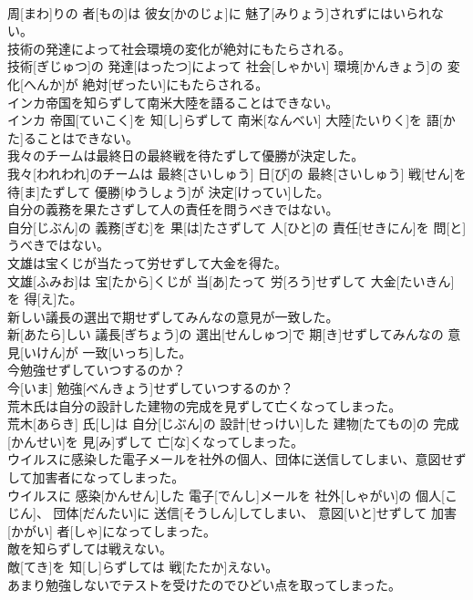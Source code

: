 \documentclass[8pt]{extreport}
\begin{document}
\begin{CJK}{UTF8}{min}
\\	周[まわ]りの 者[もの]は 彼女[かのじょ]に 魅了[みりょう]されずにはいられない。
\\	技術の発達によって社会環境の変化が絶対にもたらされる。	
\\	技術[ぎじゅつ]の 発達[はったつ]によって 社会[しゃかい] 環境[かんきょう]の 変化[へんか]が 絶対[ぜったい]にもたらされる。
\\	インカ帝国を知らずして南米大陸を語ることはできない。	
\\	インカ 帝国[ていこく]を 知[し]らずして 南米[なんべい] 大陸[たいりく]を 語[かた]ることはできない。
\\	我々のチームは最終日の最終戦を待たずして優勝が決定した。	
\\	我々[われわれ]のチームは 最終[さいしゅう] 日[び]の 最終[さいしゅう] 戦[せん]を 待[ま]たずして 優勝[ゆうしょう]が 決定[けってい]した。
\\	自分の義務を果たさずして人の責任を問うべきではない。	
\\	自分[じぶん]の 義務[ぎむ]を 果[は]たさずして 人[ひと]の 責任[せきにん]を 問[と]うべきではない。
\\	文雄は宝くじが当たって労せずして大金を得た。	
\\	文雄[ふみお]は 宝[たから]くじが 当[あ]たって 労[ろう]せずして 大金[たいきん]を 得[え]た。
\\	新しい議長の選出で期せずしてみんなの意見が一致した。	
\\	新[あたら]しい 議長[ぎちょう]の 選出[せんしゅつ]で 期[き]せずしてみんなの 意見[いけん]が 一致[いっち]した。
\\	今勉強せずしていつするのか？	
\\	今[いま] 勉強[べんきょう]せずしていつするのか？
\\	荒木氏は自分の設計した建物の完成を見ずして亡くなってしまった。	
\\	荒木[あらき] 氏[し]は 自分[じぶん]の 設計[せっけい]した 建物[たてもの]の 完成[かんせい]を 見[み]ずして 亡[な]くなってしまった。
\\	ウイルスに感染した電子メールを社外の個人、団体に送信してしまい、意図せずして加害者になってしまった。	
\\	ウイルスに 感染[かんせん]した 電子[でんし]メールを 社外[しゃがい]の 個人[こじん]、 団体[だんたい]に 送信[そうしん]してしまい、 意図[いと]せずして 加害[かがい] 者[しゃ]になってしまった。
\\	敵を知らずしては戦えない。	
\\	敵[てき]を 知[し]らずしては 戦[たたか]えない。
\\	あまり勉強しないでテストを受けたのでひどい点を取ってしまった。	

\end{CJK}
\end{document}

